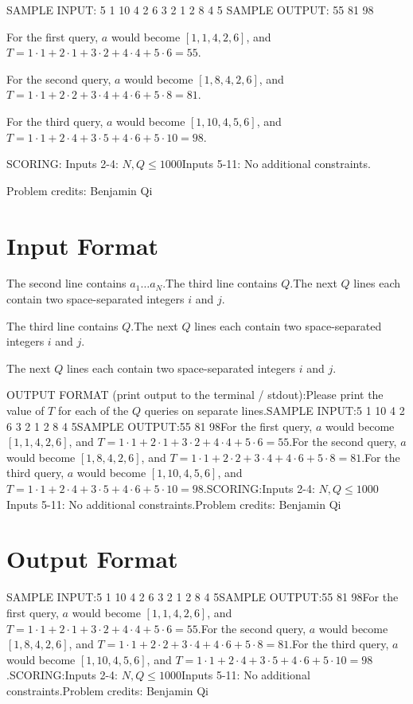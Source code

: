 \documentclass[12pt]{article}
\begin{document}
SAMPLE INPUT:
5
1 10 4 2 6
3
2 1
2 8
4 5
SAMPLE OUTPUT: 
55
81
98

For the first query, $a$ would become $[1,1,4,2,6]$, and
$T =
1 \cdot 1 + 2 \cdot 1 + 3 \cdot 2 + 4 \cdot 4 + 5 \cdot 6 = 55$.

For the second query, $a$ would become $[1,8,4,2,6]$, and
$T =
1 \cdot 1 + 2 \cdot 2 + 3 \cdot 4 + 4 \cdot 6 + 5 \cdot 8 = 81$.

For the third query, $a$ would become $[1,10,4,5,6]$, and
$T =
1 \cdot 1 + 2 \cdot 4 + 3 \cdot 5 + 4 \cdot 6 + 5 \cdot 10 = 98$.

SCORING:
Inputs 2-4: $N,Q\le 1000$Inputs 5-11: No additional
constraints.


Problem credits: Benjamin Qi



\section*{Input Format}
The second line contains $a_1\dots a_N$.The third line contains $Q$.The next $Q$ lines each contain two space-separated integers $i$ and $j$.

The third line contains $Q$.The next $Q$ lines each contain two space-separated integers $i$ and $j$.

The next $Q$ lines each contain two space-separated integers $i$ and $j$.

OUTPUT FORMAT (print output to the terminal / stdout):Please print the value of $T$ for each of the $Q$ queries on separate lines.SAMPLE INPUT:5
1 10 4 2 6
3
2 1
2 8
4 5SAMPLE OUTPUT:55
81
98For the first query, $a$ would become $[1,1,4,2,6]$, and
$T =
1 \cdot 1 + 2 \cdot 1 + 3 \cdot 2 + 4 \cdot 4 + 5 \cdot 6 = 55$.For the second query, $a$ would become $[1,8,4,2,6]$, and
$T =
1 \cdot 1 + 2 \cdot 2 + 3 \cdot 4 + 4 \cdot 6 + 5 \cdot 8 = 81$.For the third query, $a$ would become $[1,10,4,5,6]$, and
$T =
1 \cdot 1 + 2 \cdot 4 + 3 \cdot 5 + 4 \cdot 6 + 5 \cdot 10 = 98$.SCORING:Inputs 2-4: $N,Q\le 1000$Inputs 5-11: No additional
constraints.Problem credits: Benjamin Qi

\section*{Output Format}
SAMPLE INPUT:5
1 10 4 2 6
3
2 1
2 8
4 5SAMPLE OUTPUT:55
81
98For the first query, $a$ would become $[1,1,4,2,6]$, and
$T =
1 \cdot 1 + 2 \cdot 1 + 3 \cdot 2 + 4 \cdot 4 + 5 \cdot 6 = 55$.For the second query, $a$ would become $[1,8,4,2,6]$, and
$T =
1 \cdot 1 + 2 \cdot 2 + 3 \cdot 4 + 4 \cdot 6 + 5 \cdot 8 = 81$.For the third query, $a$ would become $[1,10,4,5,6]$, and
$T =
1 \cdot 1 + 2 \cdot 4 + 3 \cdot 5 + 4 \cdot 6 + 5 \cdot 10 = 98$.SCORING:Inputs 2-4: $N,Q\le 1000$Inputs 5-11: No additional
constraints.Problem credits: Benjamin Qi
\end{document}
